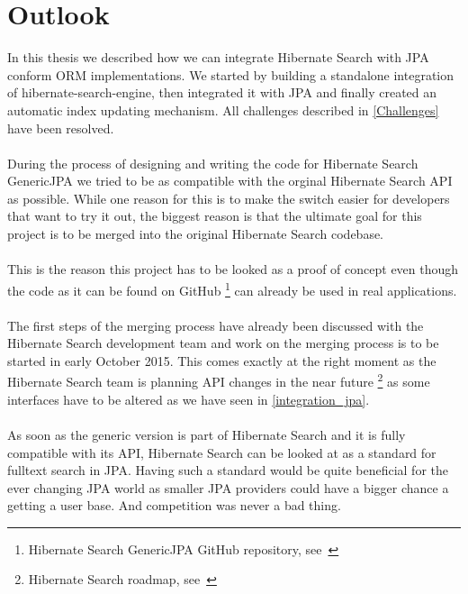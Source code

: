 \section{Outlook}\label{outlook}

In this thesis we described how we can integrate Hibernate Search with JPA conform ORM implementations. We started by building a standalone integration of hibernate-search-engine, then integrated it with JPA and finally created an automatic index updating mechanism. All challenges described in \ref{Challenges} have been resolved.
\\\\
During the process of designing and writing the code for Hibernate Search GenericJPA we tried to be as compatible with the orginal Hibernate Search API as possible. While one reason for this is to make the switch easier for developers that want to try it out, the biggest reason is that the ultimate goal for this project is to be merged into the original Hibernate Search codebase.
\\\\
This is the reason this project has to be looked as a proof of concept even though the code as it can be found on GitHub \footnote{Hibernate Search GenericJPA GitHub repository, see~\cite{hibernate_genericjpa_github}} can already be used in real applications.
\\\\
The first steps of the merging process have already been discussed with the Hibernate Search development team and work on the merging process is to be started in early October 2015. This comes exactly at the right moment as the Hibernate Search team is planning API changes in the near future \footnote{Hibernate Search roadmap, see~\cite{hibernate_search_roadmap}} as some interfaces have to be altered as we have seen in \ref{integration_jpa}.
\\\\
As soon as the generic version is part of Hibernate Search and it is fully compatible with its API, Hibernate Search can be looked at as a standard for fulltext search in JPA. Having such a standard would be quite beneficial for the ever changing JPA world as smaller JPA providers could have a bigger chance a getting a user base. And competition was never a bad thing.